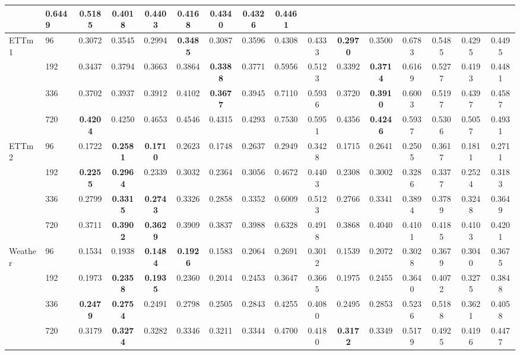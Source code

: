 \documentclass[journal]{IEEEtran}
\begin{document}
\begin{table}[!t]
\begin{tabular}{llcccccccccccccc}
        & 0.6449 & 0.5185 & 0.4018 & 0.4403 & 0.4168 & 0.4340 & 0.4326 & 0.4461 \\
\midrule
\multirow{4}{*}{ETTm1}
 & 96  & 0.3072 & 0.3545 & 0.2994 & \textbf{0.3485} & 0.3087 & 0.3596
        & 0.4308 & 0.4333 & \textbf{0.2970} & 0.3500 & 0.6783 & 0.5485 & 0.4295 & 0.4495 \\
 & 192 & 0.3437 & 0.3794 & 0.3663 & 0.3864 & \textbf{0.3388} & 0.3771
        & 0.5956 & 0.5123 & 0.3392 & \textbf{0.3714} & 0.6169 & 0.5277 & 0.4193 & 0.4481 \\
 & 336 & 0.3702 & 0.3937 & 0.3912 & 0.4102 & \textbf{0.3677} & 0.3945
        & 0.7110 & 0.5936 & 0.3720 & \textbf{0.3910} & 0.6003 & 0.5197 & 0.4397 & 0.4587 \\
 & 720 & \textbf{0.4204} & 0.4250 & 0.4653 & 0.4546 & 0.4315 & 0.4293
        & 0.7530 & 0.5951 & 0.4356 & \textbf{0.4246} & 0.5937 & 0.5306 & 0.5057 & 0.4931 \\
\midrule
\multirow{4}{*}{ETTm2}
 & 96  & 0.1722 & \textbf{0.2581} & \textbf{0.1710} & 0.2623 & 0.1748 & 0.2637
        & 0.2949 & 0.3428 & 0.1715 & 0.2641 & 0.2505 & 0.3617 & 0.1811 & 0.2711 \\
 & 192 & \textbf{0.2255} & \textbf{0.2964} & 0.2339 & 0.3032 & 0.2364 & 0.3056
        & 0.4672 & 0.4403 & 0.2308 & 0.3002 & 0.3286 & 0.3377 & 0.2524 & 0.3183 \\
 & 336 & 0.2799 & \textbf{0.3315} & \textbf{0.2743} & 0.3326 & 0.2858 & 0.3352
        & 0.6009 & 0.5123 & 0.2766 & 0.3341 & 0.3894 & 0.3789 & 0.3248 & 0.3649 \\
 & 720 & 0.3711 & \textbf{0.3902} & \textbf{0.3629} & 0.3909 & 0.3837 & 0.3988
        & 0.6328 & 0.4918 & 0.3868 & 0.4040 & 0.4101 & 0.4185 & 0.4103 & 0.4201 \\
\midrule
\multirow{4}{*}{Weather}
 & 96  & 0.1534 & 0.1938 & \textbf{0.1484} & \textbf{0.1926} & 0.1583 & 0.2064
        & 0.2691 & 0.3012 & 0.1539 & 0.2072 & 0.3028 & 0.3679 & 0.3040 & 0.3675 \\
 & 192 & 0.1973 & \textbf{0.2358} & \textbf{0.1935} & 0.2360 & 0.2014 & 0.2453
        & 0.3647 & 0.3665 & 0.1975 & 0.2455 & 0.3640 & 0.4072 & 0.3275 & 0.3848 \\
 & 336 & \textbf{0.2479} & \textbf{0.2754} & 0.2491 & 0.2798 & 0.2505 & 0.2843
        & 0.4255 & 0.4080 & 0.2495 & 0.2853 & 0.5236 & 0.5188 & 0.3621 & 0.4058 \\
 & 720 & 0.3179 & \textbf{0.3274} & 0.3282 & 0.3346 & 0.3211 & 0.3344
        & 0.4700 & 0.4180 & \textbf{0.3172} & 0.3349 & 0.5179 & 0.4925 & 0.4196 & 0.4477 \\
\bottomrule
\end{tabular}
\end{table}
\end{document}
